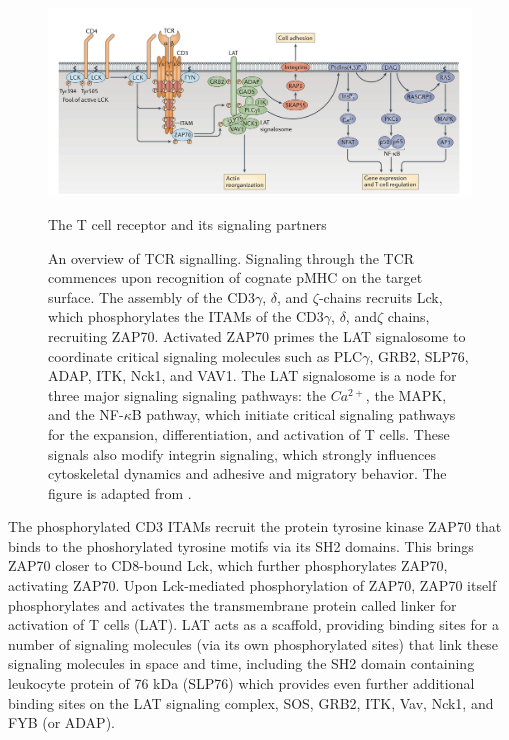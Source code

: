 \begin{figure}[htbp]
	\centering
	\includegraphics[width=\textwidth]{../figures/chapter1/tcrsignaling.png}
	\caption{The T cell receptor and its signaling partners}
	\caption*{An overview of TCR signalling. Signaling through the TCR commences upon recognition of cognate pMHC on the target surface. The assembly of the CD3$\gamma$, $\delta$, and $\zeta$-chains recruits Lck, which phosphorylates the ITAMs of the CD3$\gamma$, $\delta$, and$\zeta$ chains, recruiting ZAP70. Activated ZAP70 primes the LAT signalosome to coordinate critical signaling molecules such as PLC$\gamma$, GRB2, SLP76, ADAP, ITK, Nck1, and VAV1. The LAT signalosome is a node for three major signaling signaling pathways: the $Ca^{2+}$, the MAPK, and the NF-$\kappa$B pathway, which initiate critical signaling pathways for the expansion, differentiation, and activation of T cells. These signals also modify integrin signaling, which strongly influences cytoskeletal dynamics and adhesive and migratory behavior. The figure is adapted from \cite{Brownlie2013}.}
	\label{fig:tcrsignaling}
\end{figure}

The phosphorylated CD3 ITAMs recruit the protein tyrosine kinase ZAP70 that binds to the phoshorylated tyrosine motifs via its SH2 domains. This brings ZAP70 closer to CD8-bound Lck, which further phosphorylates ZAP70, activating ZAP70. Upon Lck-mediated phosphorylation of ZAP70, ZAP70 itself phosphorylates and activates the transmembrane protein called linker for activation of T cells (LAT). LAT acts as a scaffold, providing binding sites for a number of signaling molecules (via its own phosphorylated sites) that link these signaling molecules in space and time, including the SH2 domain containing leukocyte protein of 76 kDa (SLP76) which provides even further additional binding sites on the LAT signaling complex, SOS, GRB2, ITK, Vav, Nck1, and FYB (or ADAP).

